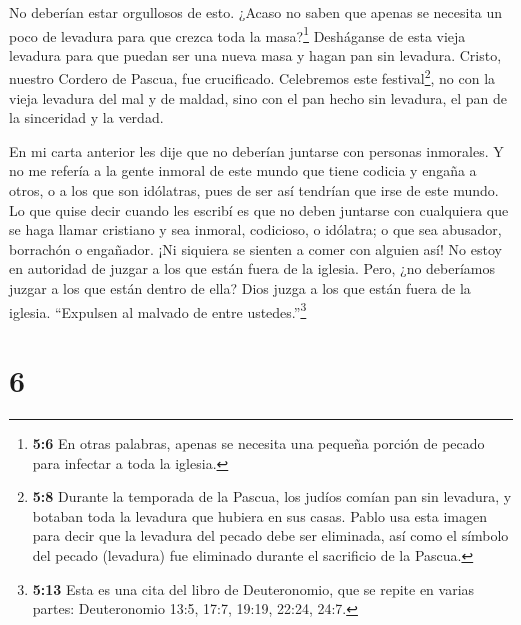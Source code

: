  No deberían estar orgullosos de esto. ¿Acaso no saben que
apenas se necesita un poco de levadura para que crezca toda la
masa?\footnote{\textbf{5:6} En otras palabras, apenas se necesita una
  pequeña porción de pecado para infectar a toda la iglesia.}
 Desháganse de esta vieja levadura para que puedan ser una
nueva masa y hagan pan sin levadura. Cristo, nuestro Cordero de Pascua,
fue crucificado.  Celebremos este festival\footnote{\textbf{5:8}
  Durante la temporada de la Pascua, los judíos comían pan sin levadura,
  y botaban toda la levadura que hubiera en sus casas. Pablo usa esta
  imagen para decir que la levadura del pecado debe ser eliminada, así
  como el símbolo del pecado (levadura) fue eliminado durante el
  sacrificio de la Pascua.}, no con la vieja levadura del mal y de
maldad, sino con el pan hecho sin levadura, el pan de la sinceridad y la
verdad.

 En mi carta anterior les dije que no deberían juntarse con
personas inmorales.  Y no me refería a la gente inmoral de
este mundo que tiene codicia y engaña a otros, o a los que son
idólatras, pues de ser así tendrían que irse de este mundo.
 Lo que quise decir cuando les escribí es que no deben
juntarse con cualquiera que se haga llamar cristiano y sea inmoral,
codicioso, o idólatra; o que sea abusador, borrachón o engañador. ¡Ni
siquiera se sienten a comer con alguien así!  No estoy en
autoridad de juzgar a los que están fuera de la iglesia. Pero, ¿no
deberíamos juzgar a los que están dentro de ella?  Dios
juzga a los que están fuera de la iglesia. ``Expulsen al malvado de
entre ustedes.''\footnote{\textbf{5:13} Esta es una cita del libro de
  Deuteronomio, que se repite en varias partes: Deuteronomio 13:5, 17:7,
  19:19, 22:24, 24:7.}

\hypertarget{section-5}{%
\section{6}\label{section-5}}

